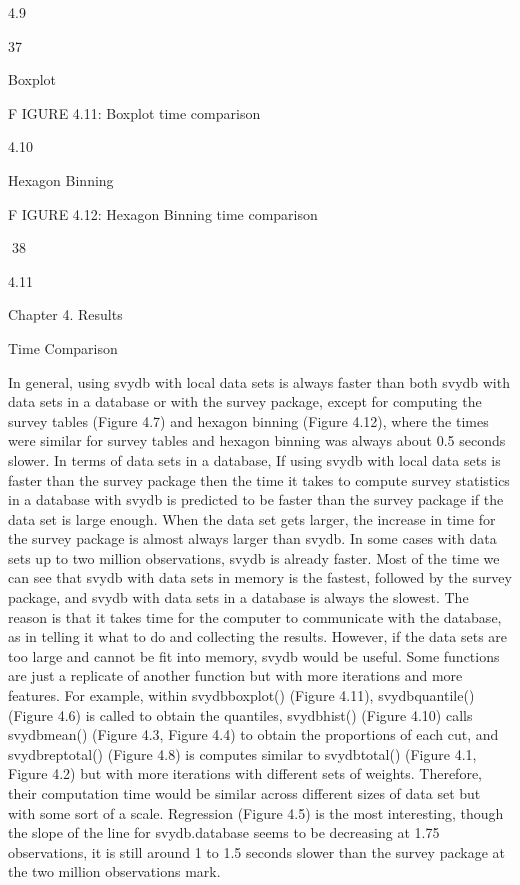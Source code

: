4.9

37

Boxplot

F IGURE 4.11: Boxplot time comparison

4.10

Hexagon Binning

F IGURE 4.12: Hexagon Binning time comparison

38

4.11

Chapter 4. Results

Time Comparison

In general, using svydb with local data sets is always faster than both svydb with
data sets in a database or with the survey package, except for computing the survey
tables (Figure 4.7) and hexagon binning (Figure 4.12), where the times were similar
for survey tables and hexagon binning was always about 0.5 seconds slower.
In terms of data sets in a database, If using svydb with local data sets is faster
than the survey package then the time it takes to compute survey statistics in a
database with svydb is predicted to be faster than the survey package if the data
set is large enough. When the data set gets larger, the increase in time for the survey
package is almost always larger than svydb. In some cases with data sets up to two
million observations, svydb is already faster.
Most of the time we can see that svydb with data sets in memory is the fastest,
followed by the survey package, and svydb with data sets in a database is always
the slowest. The reason is that it takes time for the computer to communicate with
the database, as in telling it what to do and collecting the results. However, if the
data sets are too large and cannot be fit into memory, svydb would be useful.
Some functions are just a replicate of another function but with more iterations
and more features. For example, within svydbboxplot() (Figure 4.11), svydbquantile() (Figure 4.6) is called to obtain the quantiles, svydbhist() (Figure 4.10) calls svydbmean() (Figure 4.3, Figure 4.4) to obtain the proportions of each cut, and svydbreptotal() (Figure 4.8) is computes similar to svydbtotal() (Figure 4.1, Figure 4.2)
but with more iterations with different sets of weights. Therefore, their computation
time would be similar across different sizes of data set but with some sort of a scale.
Regression (Figure 4.5) is the most interesting, though the slope of the line for
svydb.database seems to be decreasing at 1.75 observations, it is still around 1 to
1.5 seconds slower than the survey package at the two million observations mark.

